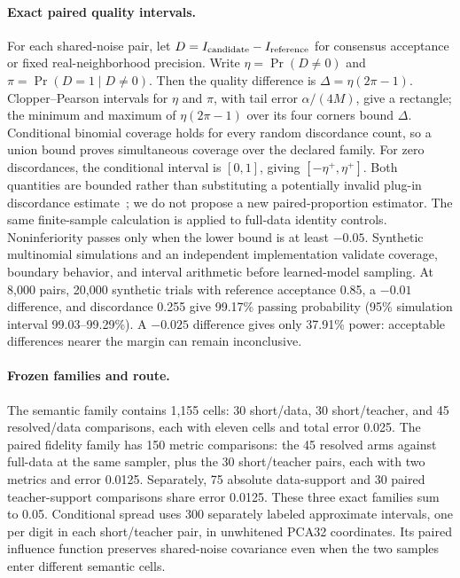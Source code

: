 \paragraph{Exact paired quality intervals.}\label{supp:mnist_paired_quality}
For each shared-noise pair, let $D=I_{\rm candidate}-I_{\rm reference}$
for consensus acceptance or fixed real-neighborhood precision. Write
$\eta=\Pr(D\ne0)$ and $\pi=\Pr(D=1\mid D\ne0)$. Then the quality
difference is $\Delta=\eta(2\pi-1)$. Clopper--Pearson intervals for
$\eta$ and $\pi$, with tail error $\alpha/(4M)$, give a rectangle;
the minimum and maximum of $\eta(2\pi-1)$ over its four corners bound
$\Delta$. Conditional binomial coverage holds for every random discordance
count, so a union bound proves simultaneous coverage over the declared family.
For zero discordances, the conditional interval is $[0,1]$, giving
$[-\eta^+,\eta^+]$. Both quantities are bounded rather than substituting
a potentially invalid plug-in discordance estimate~\cite{newcombe1998paired};
we do not propose a new paired-proportion estimator.
The same finite-sample calculation is applied to full-data identity controls.
Noninferiority passes only when the lower bound is at least $-0.05$.
Synthetic multinomial simulations and an independent implementation validate
coverage, boundary behavior, and interval arithmetic before learned-model
sampling. At 8,000 pairs, 20,000 synthetic trials with reference acceptance 0.85,
a $-0.01$ difference, and discordance 0.255 give 99.17\% passing probability
(95\% simulation interval 99.03--99.29\%). A $-0.025$ difference gives only
37.91\% power: acceptable differences nearer the margin can remain inconclusive.

\paragraph{Frozen families and route.}
The semantic family contains 1,155 cells: 30 short/data, 30 short/teacher,
and 45 resolved/data comparisons, each with eleven cells and total error
0.025. The paired fidelity family has 150 metric comparisons: the 45 resolved
arms against full-data at the same sampler, plus the 30 short/teacher pairs,
each with two metrics and error 0.0125. Separately, 75 absolute data-support
and 30 paired teacher-support comparisons share error 0.0125. These three
exact families sum to 0.05. Conditional spread uses 300 separately labeled
approximate intervals, one per digit in each short/teacher pair, in unwhitened
PCA32 coordinates. Its paired influence function preserves shared-noise
covariance even when the two samples enter different semantic cells.

